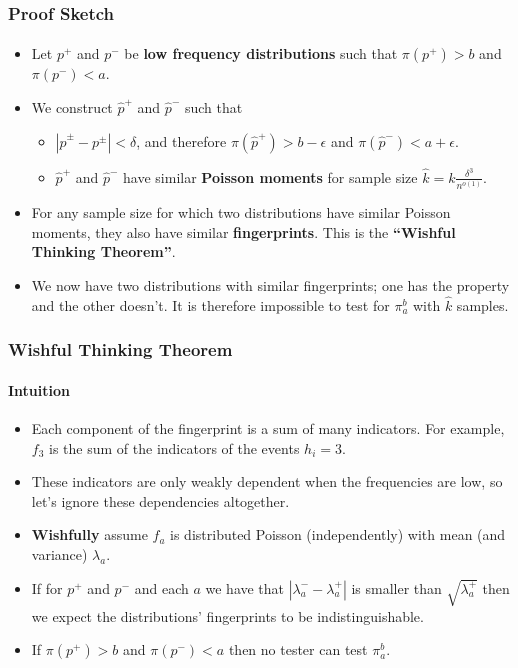 \documentclass{beamer}
\begin{document}
\begin{frame}
  \frametitle{Proof Sketch} \framesubtitle{}

  \begin{itemize}
  \item<1-> Let $p^+$ and $p^-$ be {\bf low frequency distributions}
    such that $\pi(p^+)>b$ and $\pi(p^-)<a$.
  \item<2-> We construct $\hat{p}^+$ and $\hat{p}^-$ such that
    \begin{itemize}
    \item<3-> $|\hat{p}^\pm-p^\pm|<\delta$, and therefore
      $\pi(\hat{p}^+)>b-\epsilon$ and
      $\pi(\hat{p}^-)<a+\epsilon$.
    \item<4->$\hat{p}^+$ and $\hat{p}^-$ have similar {\bf Poisson
        moments} for sample size $\hat{k}=k\frac{\delta^3}{n^{o(1)}}$.
    \end{itemize}
  \item<5-> For any sample size for which two distributions have similar
    Poisson moments, they also have similar {\bf fingerprints}. This
    is the {\bf ``Wishful Thinking Theorem''}.
  \item<6-> We now have two distributions with similar fingerprints;
    one has the property and the other doesn't. It is therefore
    impossible to test for $\pi_a^b$ with $\hat{k}$ samples.
  \end{itemize}

\end{frame}


\begin{frame}
  \frametitle{Wishful Thinking Theorem} \framesubtitle{Intuition}

  \begin{block}{}
    \begin{itemize}
    \item<1-> Each component of the fingerprint is a sum of many
      indicators. For example, $f_3$ is the sum of the indicators of
      the events $h_i=3$.
    \item<2-> These indicators are only weakly dependent when the
      frequencies are low, so let's ignore these dependencies
      altogether.
    \item<3-> {\bf Wishfully} assume $f_a$ is distributed Poisson
      (independently) with mean (and variance) $\lambda_a$.
    \item<4-> If for $p^+$ and $p^-$ and each $a$ we have that
      $|\lambda^-_a-\lambda^+_a|$ is smaller than $\sqrt{\lambda^+_a}$
      then we expect the distributions' fingerprints to be
      indistinguishable.
    \item<5-> If $\pi(p^+)>b$ and $\pi(p^-)<a$ then no tester can test
      $\pi_a^b$.
    \end{itemize}
  \end{block}
\end{frame}
\end{document}
